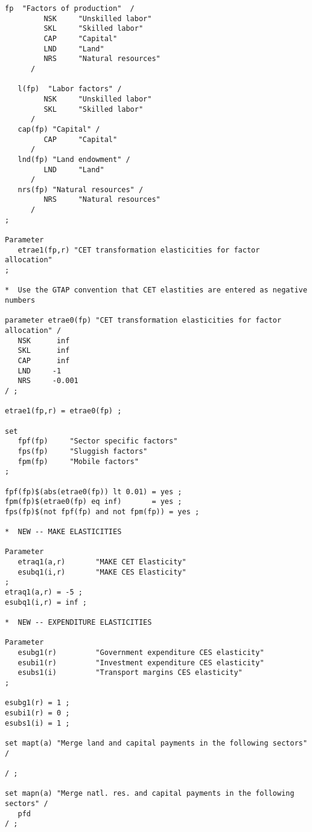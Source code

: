 \begin{lstlisting}[language=GAMS, caption={Mapping file for primary aggregation}, label=lst:PrimAgg]
   fp  "Factors of production"  /
         NSK     "Unskilled labor"
         SKL     "Skilled labor"
         CAP     "Capital"
         LND     "Land"
         NRS     "Natural resources"
      /

   l(fp)  "Labor factors" /
         NSK     "Unskilled labor"
         SKL     "Skilled labor"
      /
   cap(fp) "Capital" /
         CAP     "Capital"
      /
   lnd(fp) "Land endowment" /
         LND     "Land"
      /
   nrs(fp) "Natural resources" /
         NRS     "Natural resources"
      /
;

Parameter
   etrae1(fp,r) "CET transformation elasticities for factor allocation"
;

*  Use the GTAP convention that CET elastities are entered as negative numbers

parameter etrae0(fp) "CET transformation elasticities for factor allocation" /
   NSK      inf
   SKL      inf
   CAP      inf
   LND     -1
   NRS     -0.001
/ ;

etrae1(fp,r) = etrae0(fp) ;

set
   fpf(fp)     "Sector specific factors"
   fps(fp)     "Sluggish factors"
   fpm(fp)     "Mobile factors"
;

fpf(fp)$(abs(etrae0(fp)) lt 0.01) = yes ;
fpm(fp)$(etrae0(fp) eq inf)       = yes ;
fps(fp)$(not fpf(fp) and not fpm(fp)) = yes ;

*  NEW -- MAKE ELASTICITIES

Parameter
   etraq1(a,r)       "MAKE CET Elasticity"
   esubq1(i,r)       "MAKE CES Elasticity"
;
etraq1(a,r) = -5 ;
esubq1(i,r) = inf ;

*  NEW -- EXPENDITURE ELASTICITIES

Parameter
   esubg1(r)         "Government expenditure CES elasticity"
   esubi1(r)         "Investment expenditure CES elasticity"
   esubs1(i)         "Transport margins CES elasticity"
;

esubg1(r) = 1 ;
esubi1(r) = 0 ;
esubs1(i) = 1 ;

set mapt(a) "Merge land and capital payments in the following sectors" /

/ ;

set mapn(a) "Merge natl. res. and capital payments in the following sectors" /
   pfd
/ ;


\end{lstlisting}
